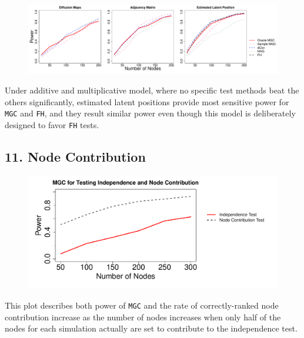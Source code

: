 \documentclass[12pt]{article}
\begin{document}
\begin{figure}[H]
	\centering
	\includegraphics[width=6in]{../Figure/ame.pdf}
	\label{fig:ame}
\end{figure}	

Under additive and multiplicative model, where no specific test methods beat the others significantly, estimated latent positions provide most sensitive power for \texttt{MGC} and \texttt{FH}, and they result similar power even though this model is deliberately designed to favor \texttt{FH} tests.

\subsection*{11. Node Contribution}

\begin{figure}[H]
	\centering
	\includegraphics[width=6in]{../Figure/nodecontri.pdf}
	\label{fig:contribution}
\end{figure}

This plot describes both power of \texttt{MGC} and the rate of correctly-ranked node contribution increase as the number of nodes increases when only half of the nodes for each simulation actually are set to contribute to the independence test. 
\end{document}
